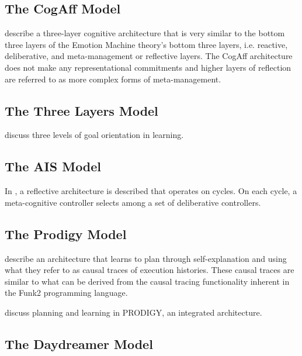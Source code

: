 \subsection{The CogAff Model}

\cite{sloman:2001} describe a three-layer cognitive architecture that is very similar to the bottom three layers of the Emotion Machine theory's bottom three layers, i.e. reactive, deliberative, and meta-management or reflective layers.
The CogAff architecture does not make any representational commitments and higher layers of reflection are referred to as more complex forms of meta-management.

\subsection{The Three Layers Model}

\cite{ngbereiter:1995} discuss three levels of goal orientation in learning.

\subsection{The AIS Model}

In \cite{hayesroth:1995}, a reflective architecture is described that operates on cycles.
On each cycle, a meta-cognitive controller selects among a set of deliberative controllers.

\subsection{The Prodigy Model}

\cite{carbonell:1991} describe an architecture that learns to plan through self-explanation and using what they refer to as causal traces of execution histories.
These causal traces are similar to what can be derived from the causal tracing functionality inherent in the Funk2 programming language.

\cite{carbonell:1995} discuss planning and learning in PRODIGY, an integrated architecture.

\subsection{The Daydreamer Model}


\cite{mueller:1990}
























































